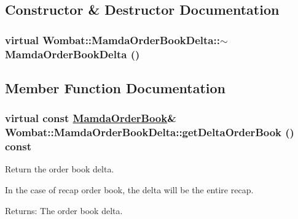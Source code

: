 \subsection{Constructor \& Destructor Documentation}
\hypertarget{classWombat_1_1MamdaOrderBookDelta_a10bb01dfd7807dc9ebf21080798b357}{
\subsubsection[$\sim$MamdaOrderBookDelta]{\setlength{\rightskip}{0pt plus 5cm}virtual Wombat::Mamda\-Order\-Book\-Delta::$\sim$Mamda\-Order\-Book\-Delta ()}}
\label{classWombat_1_1MamdaOrderBookDelta_a10bb01dfd7807dc9ebf21080798b357}




\subsection{Member Function Documentation}
\hypertarget{classWombat_1_1MamdaOrderBookDelta_4bd9e50ba3d3131925d4d200a9ab60ab}{
\subsubsection[getDeltaOrderBook]{\setlength{\rightskip}{0pt plus 5cm}virtual const \hyperlink{classWombat_1_1MamdaOrderBook}{Mamda\-Order\-Book}\& Wombat::Mamda\-Order\-Book\-Delta::get\-Delta\-Order\-Book () const}}
\label{classWombat_1_1MamdaOrderBookDelta_4bd9e50ba3d3131925d4d200a9ab60ab}


Return the order book delta. 

In the case of recap order book, the delta will be the entire recap.

\begin{Desc}
\item[Returns:]The order book delta. \end{Desc}
